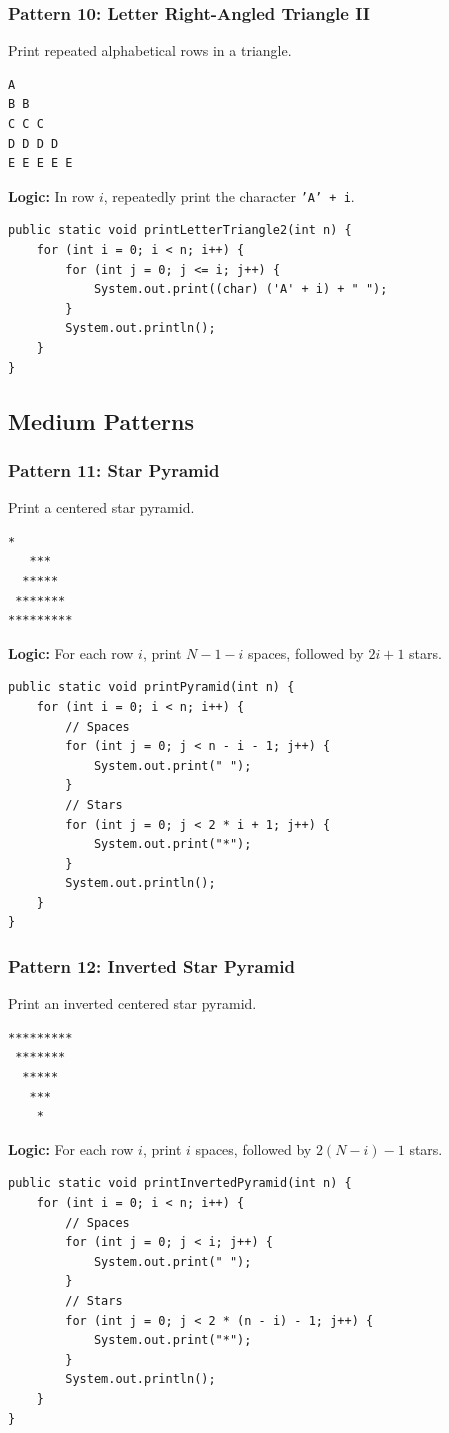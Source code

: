 \documentclass[12pt,a4paper,oneside]{book}
\begin{document}
\subsubsection{Pattern 10: Letter Right-Angled Triangle II}
Print repeated alphabetical rows in a triangle.
\begin{lstlisting}[frame=single]
A
B B
C C C
D D D D
E E E E E
\end{lstlisting}
\textbf{Logic:} In row $i$, repeatedly print the character \texttt{'A' + i}.
\begin{lstlisting}[caption={Letter Right-Angled Triangle II}]
public static void printLetterTriangle2(int n) {
    for (int i = 0; i < n; i++) {
        for (int j = 0; j <= i; j++) {
            System.out.print((char) ('A' + i) + " ");
        }
        System.out.println();
    }
}
\end{lstlisting}


\subsection{Medium Patterns}

\subsubsection{Pattern 11: Star Pyramid}
Print a centered star pyramid.
\begin{lstlisting}[frame=single]
    *
   ***
  *****
 *******
*********
\end{lstlisting}
\textbf{Logic:} For each row $i$, print $N-1-i$ spaces, followed by $2i+1$ stars.
\begin{lstlisting}[caption={Star Pyramid}]
public static void printPyramid(int n) {
    for (int i = 0; i < n; i++) {
        // Spaces
        for (int j = 0; j < n - i - 1; j++) {
            System.out.print(" ");
        }
        // Stars
        for (int j = 0; j < 2 * i + 1; j++) {
            System.out.print("*");
        }
        System.out.println();
    }
}
\end{lstlisting}

\subsubsection{Pattern 12: Inverted Star Pyramid}
Print an inverted centered star pyramid.
\begin{lstlisting}[frame=single]
*********
 *******
  *****
   ***
    *
\end{lstlisting}
\textbf{Logic:} For each row $i$, print $i$ spaces, followed by $2(N-i)-1$ stars.
\begin{lstlisting}[caption={Inverted Star Pyramid}]
public static void printInvertedPyramid(int n) {
    for (int i = 0; i < n; i++) {
        // Spaces
        for (int j = 0; j < i; j++) {
            System.out.print(" ");
        }
        // Stars
        for (int j = 0; j < 2 * (n - i) - 1; j++) {
            System.out.print("*");
        }
        System.out.println();
    }
}
\end{lstlisting}
\end{document}
